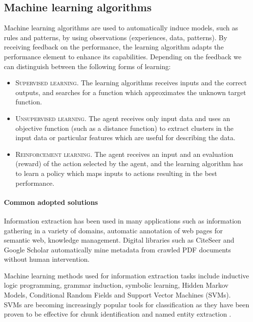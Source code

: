 \subsection{\label{subsec:mla}Machine learning algorithms}
Machine learning algorithms are used to automatically induce models, such as rules and patterns, by using observations (experiences, data, patterns). By receiving feedback on the performance, the learning algorithm adapts the performance element to enhance its capabilities. Depending on the feedback we can distinguish between the following forms of learning:
\begin{itemize}
 \item \textsc{Supervised learning}. The learning algorithms receives inputs and the correct outputs, and searches for a function which approximates the unknown target function.
 \item \textsc{Unsupervised learning}. The agent receives only input data and uses an objective function (such as a distance function) to extract clusters in the input data or particular features which are useful for describing the data.
 \item \textsc{Reinforcement learning}. The agent receives an input and an evaluation (reward) of the action selected by the agent, and the learning algorithm has to learn a policy which maps inputs to actions resulting in the best performance.
\end{itemize}

\paragraph{Common adopted solutions}Information extraction has been used in many applications such as information gathering in a variety of domains, automatic annotation of web pages for semantic web, knowledge management. Digital libraries such as CiteSeer \cite{lawrence1999dla,giles1998cac,bollacker1998caw} and Google Scholar automatically mine metadata from crawled PDF documents without human intervention.

Machine learning methods used for information extraction tasks \cite{dietterich2002mls} include inductive logic programming, grammar induction, symbolic learning, Hidden Markov Models, Conditional Random Fields \cite{peng2004aie} and Support Vector Machines (SVMs). SVMs are becoming increasingly popular tools for classification as they have been proven to be effective for chunk identification and named entity extraction \cite{han2003adm, kudoh2000usv, seymore1999lhm}.

